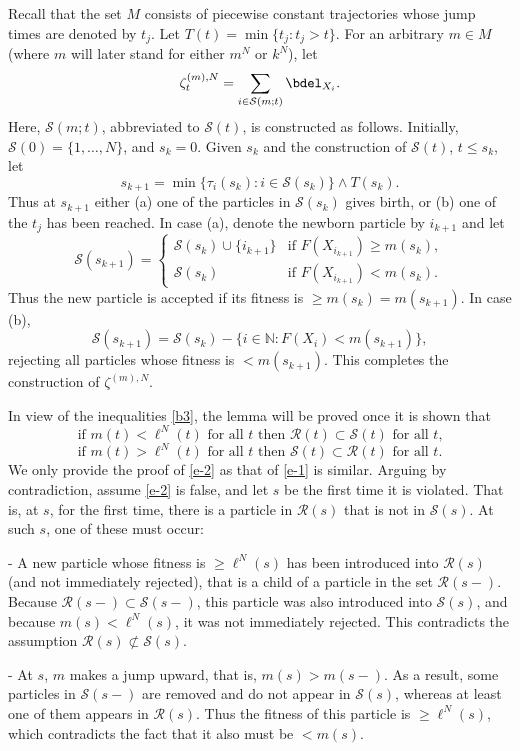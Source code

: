 \documentclass[11pt]{amsart}
\theoremstyle{plain}
\newcommand{\N}{{\mathbb N}}
\newcommand{\calR}{{\mathcal R}}
\newcommand{\calS}{{\mathcal S}}
\newcommand{\w}{\wedge}
\begin{document}
Recall that the set $M$ consists of piecewise constant trajectories whose jump times are denoted by $t_j$. Let $T(t)=\min\{t_j:t_j>t\}$. For an arbitrary $m\in M$ (where $m$ will later stand for either $m^N$ or $k^N$), let
\[
\zeta^{(m),N}_t=\sum_{i\in\calS(m;t)}\bdel_{X_i}.
\]
Here, $\calS(m;t)$, abbreviated to $\calS(t)$, is constructed as follows. Initially, $\calS(0)=\{1,\ldots,N\}$, and $s_k=0$. Given $s_k$ and the construction of $\calS(t)$, $t\le s_k$, let
\[
s_{k+1}=\min\{\tau_i(s_k):i\in\calS(s_k)\}\w T(s_k).
\]
Thus at $s_{k+1}$ either (a) one of the particles in $\calS(s_k)$ gives birth, or (b) one of the $t_j$ has been reached. In case (a), denote the newborn particle by $i_{k+1}$ and let
\[
\calS(s_{k+1})=\begin{cases}\calS(s_k)\cup\{i_{k+1}\}
& \text{if } F(X_{i_{k+1}})\ge m(s_k),
\\
\calS(s_k) & \text{if } F(X_{i_{k+1}})< m(s_k).
\end{cases}
\]
Thus the new particle is accepted if its fitness is $\ge m(s_k)=m(s_{k+1})$. In case (b),
\[
\calS(s_{k+1})=\calS(s_k)-\{i\in\N:F(X_i)<m(s_{k+1})\},
\]
rejecting all particles whose fitness is $<m(s_{k+1})$. This completes the construction of $\zeta^{(m),N}$.

In view of the inequalities \eqref{b3}, the lemma will be proved once it is shown that
\begin{equation}\label{e-2}
\text{
if $m(t)<\ell^N(t)$ for all $t$ then $\calR(t)\subset\calS(t)$ for all $t$,
}
\end{equation}
\begin{equation}\label{e-1}
\text{
if $m(t)>\ell^N(t)$ for all $t$ then $\calS(t)\subset\calR(t)$ for all $t$.
}
\end{equation}
We only provide the proof of \eqref{e-2} as that of \eqref{e-1} is similar.
Arguing by contradiction, assume \eqref{e-2} is false, and let $s$ be the first time it is violated. That is, at $s$, for the first time, there is a particle in $\calR(s)$ that is not in $\calS(s)$. At such $s$, one of these must occur:

- A new particle whose fitness is $\ge\ell^N(s)$ has been introduced into $\calR(s)$ (and not immediately rejected), that is a child of a particle in the set $\calR(s-)$. Because $\calR(s-)\subset\calS(s-)$, this particle was also introduced into $\calS(s)$, and because $m(s)<\ell^N(s)$, it was not immediately rejected. This contradicts the assumption $\calR(s)\not\subset\calS(s)$.

- At $s$, $m$ makes a jump upward, that is, $m(s)>m(s-)$. As a result, some particles in $\calS(s-)$ are removed and do not appear in $\calS(s)$, whereas at least one of them appears in $\calR(s)$. Thus the fitness of this particle is $\ge\ell^N(s)$, which contradicts the fact that it also must be $<m(s)$.
\end{document}
